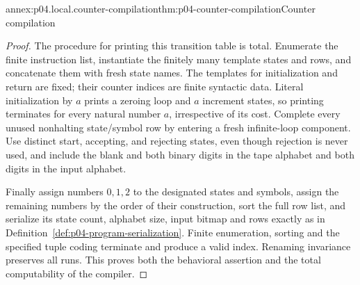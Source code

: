 \begin{annexitem}{annex:p04.local.counter-compilation}{thm:p04-counter-compilation}{Counter compilation}
\begin{proof}
The procedure for printing this transition table is total.  Enumerate
the finite instruction list, instantiate the finitely many template
states and rows, and concatenate them with fresh state names.  The
templates for initialization and return are fixed; their counter indices
are finite syntactic data.  Literal initialization by \(a\) prints a
zeroing loop and \(a\) increment states, so printing terminates for every
natural number \(a\), irrespective of its cost.  Complete every unused
nonhalting state/symbol row by entering a fresh infinite-loop component.
Use distinct start, accepting, and rejecting states, even though rejection
is never used, and include the blank and both binary digits in the tape
alphabet and both digits in the input alphabet.

Finally assign numbers \(0,1,2\) to the designated states and symbols,
assign the remaining numbers by the order of their construction, sort
the full row list, and serialize its state count, alphabet size, input
bitmap and rows exactly as in
Definition~\ref{def:p04-program-serialization}.  Finite enumeration,
sorting and the specified tuple coding terminate and produce a valid
index.  Renaming invariance preserves all runs.  This proves both the
behavioral assertion and the total computability of the compiler.
\end{proof}
\end{annexitem}

